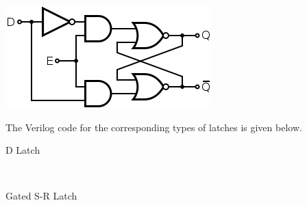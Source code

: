 \documentclass[11pt]{article}
\begin{document}
\begin{description}
	\includegraphics[scale=1]{dl.png}
\end{description}

The Verilog code for the corresponding types of latches is given below. 
\begin{description}
	\item[D Latch] \hfill \\
	
	\item[Gated S-R Latch] \hfill \\
	
\end{description}
\end{document}
